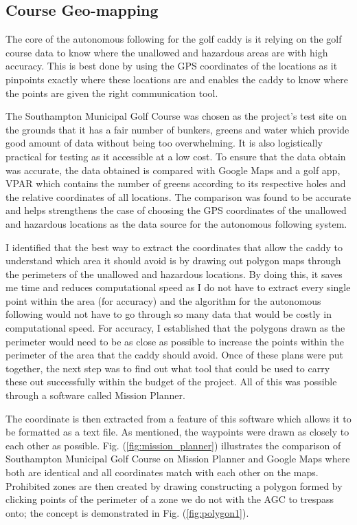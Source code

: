 \documentclass[11pt,landscape]{article}
\begin{document}
\begin{multicols}{3}
\section{Course Geo-mapping}
The core of the autonomous following for the golf caddy is it relying on the
golf course data to know where the unallowed and hazardous areas are with high
accuracy. This is best done by using the GPS coordinates of the locations as it
pinpoints exactly where these locations are and enables the caddy to know where
the points are given the right communication tool.

The Southampton Municipal Golf Course was chosen as the project’s test site on
the grounds that it has a fair number of bunkers, greens and water which provide
good amount of data without being too overwhelming. It is also logistically
practical for testing as it accessible at a low cost. To ensure that the data
obtain was accurate, the data obtained is compared with Google Maps and a golf
app, VPAR which contains the number of greens according to its respective holes
and the relative coordinates of all locations. The comparison was found to be
accurate and helps strengthens the case of choosing the GPS coordinates of the
unallowed and hazardous locations as the data source for the autonomous
following system. 

 I identified that the best way to extract the coordinates that allow
the caddy to understand which area it should avoid is by drawing out polygon
maps through the perimeters of the unallowed and hazardous locations. By doing
this, it saves me time and reduces computational speed as I do not have to
extract every single point within the area (for accuracy) and the algorithm for
the autonomous following would not have to go through so many data that would be
costly in computational speed. For accuracy, I established that the polygons
drawn as the perimeter would need to be as close as possible to increase the
points within the perimeter of the area that the caddy should avoid. Once of
these plans were put together, the next step was to find out what tool that
could be used to carry these out successfully within the budget of the project.
All of this was possible through a software called Mission Planner.

The coordinate is then extracted from a feature of this software which allows it
to be formatted as a text file. As mentioned, the waypoints were drawn as
closely to each other as possible. Fig. (\ref{fig:mission_planner}) illustrates
the comparison of Southampton Municipal Golf Course on Mission Planner and
Google Maps where both are identical and all coordinates match with each other
on the maps. Prohibited zones are then created by drawing constructing a polygon
formed by clicking points of the perimeter of a zone we do not with the AGC to
trespass onto; the concept is demonstrated in Fig. (\ref{fig:polygon1}).


\end{multicols}
\end{document}
